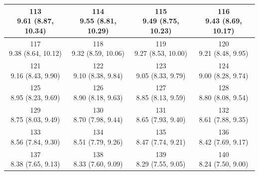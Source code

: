 \begin{table}[htbp]
\begin{tabular}{cccc}
\hline
\shortstack[c]{113\\9.61 (8.87, 10.34)} & \shortstack[c]{114\\9.55 (8.81, 10.29)} & \shortstack[c]{115\\9.49 (8.75, 10.23)} & \shortstack[c]{116\\9.43 (8.69, 10.17)} \\
\hline
\shortstack[c]{117\\9.38 (8.64, 10.12)} & \shortstack[c]{118\\9.32 (8.59, 10.06)} & \shortstack[c]{119\\9.27 (8.53, 10.00)} & \shortstack[c]{120\\9.21 (8.48, 9.95)} \\
\hline
\shortstack[c]{121\\9.16 (8.43, 9.90)} & \shortstack[c]{122\\9.10 (8.38, 9.84)} & \shortstack[c]{123\\9.05 (8.33, 9.79)} & \shortstack[c]{124\\9.00 (8.28, 9.74)} \\
\hline
\shortstack[c]{125\\8.95 (8.23, 9.69)} & \shortstack[c]{126\\8.90 (8.18, 9.63)} & \shortstack[c]{127\\8.85 (8.13, 9.59)} & \shortstack[c]{128\\8.80 (8.08, 9.54)} \\
\hline
\shortstack[c]{129\\8.75 (8.03, 9.49)} & \shortstack[c]{130\\8.70 (7.98, 9.44)} & \shortstack[c]{131\\8.65 (7.93, 9.40)} & \shortstack[c]{132\\8.61 (7.88, 9.35)} \\
\hline
\shortstack[c]{133\\8.56 (7.84, 9.30)} & \shortstack[c]{134\\8.51 (7.79, 9.26)} & \shortstack[c]{135\\8.47 (7.74, 9.21)} & \shortstack[c]{136\\8.42 (7.69, 9.17)} \\
\hline
\shortstack[c]{137\\8.38 (7.65, 9.13)} & \shortstack[c]{138\\8.33 (7.60, 9.09)} & \shortstack[c]{139\\8.29 (7.55, 9.05)} & \shortstack[c]{140\\8.24 (7.50, 9.00)} \\

\end{tabular}
\end{table}

